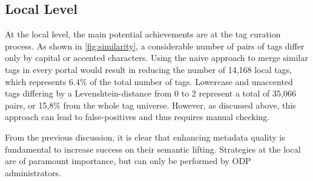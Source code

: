 \subsection{Local Level}

At the local level, the main potential achievements are at the tag curation process.
As shown in \autoref{fig:similarity}, a considerable number of pairs of tags differ only by capital or accented characters.
Using the naive approach to merge similar tags in every portal would result in reducing the number of 14,168 local tags, which represents 6.4\% of the total number of tags.
Lowercase and unaccented tags differing by a Levenshtein-distance from 0 to 2 represent a total of 35,066 pairs, or 15,8\% from the whole tag universe.
However, as discussed above, this approach can lead to false-positives and thus requires manual checking.

From the previous discussion, it is clear that enhancing metadata quality is fundamental to increase success on their semantic lifting.
Strategies at the local are of paramount importance, but can only be performed by ODP administrators.




